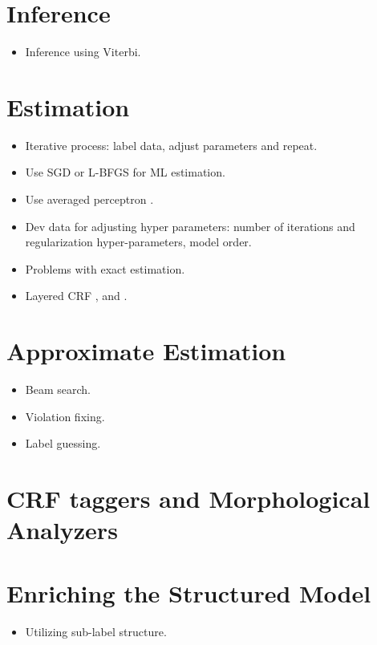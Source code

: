 \section{Inference}
\begin{itemize}
\item Inference using Viterbi.
\end{itemize}

\section{Estimation}
\begin{itemize}
\item Iterative process: label data, adjust parameters and repeat.
\item Use SGD or L-BFGS \citep{Vishwanathan2006} for ML estimation. 
\item Use averaged perceptron \citep{Collins2002}.
\item Dev data for adjusting hyper parameters: number of iterations and
  regularization hyper-parameters, model order.
\item Problems with exact estimation.
\item Layered CRF \cite{Mueller2013}, \cite{Weiss2010} and \cite{Charniak2005}.
\end{itemize}

\section{Approximate Estimation}
\begin{itemize}
\item Beam search.
\item Violation fixing.
\item Label guessing.
\end{itemize}
\section{CRF taggers and Morphological Analyzers}

\section{Enriching the Structured Model}\label{sec:sub-labels}
\begin{itemize}
\item Utilizing sub-label structure.
\end{itemize}

